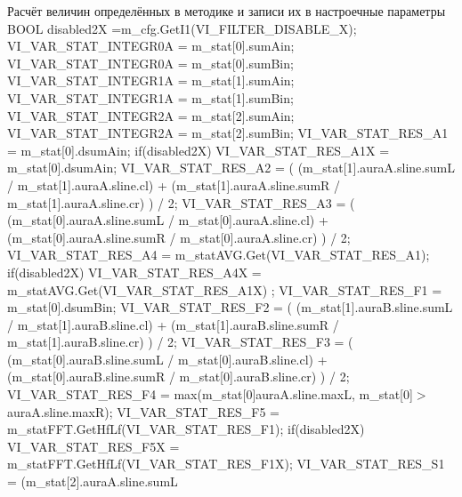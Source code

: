Расчёт величин определённых в методике и записи их в настроечные параметры B\+O\+O\+L disabled2\+X =m\+\_\+cfg.\+Get\+I1(\+V\+I\+\_\+\+F\+I\+L\+T\+E\+R\+\_\+\+D\+I\+S\+A\+B\+L\+E\+\_\+X); V\+I\+\_\+\+V\+A\+R\+\_\+\+S\+T\+A\+T\+\_\+\+I\+N\+T\+E\+G\+R0\+A = m\+\_\+stat\mbox{[}0\mbox{]}.sum\+Ain; V\+I\+\_\+\+V\+A\+R\+\_\+\+S\+T\+A\+T\+\_\+\+I\+N\+T\+E\+G\+R0\+A = m\+\_\+stat\mbox{[}0\mbox{]}.sum\+Bin; V\+I\+\_\+\+V\+A\+R\+\_\+\+S\+T\+A\+T\+\_\+\+I\+N\+T\+E\+G\+R1\+A = m\+\_\+stat\mbox{[}1\mbox{]}.sum\+Ain; V\+I\+\_\+\+V\+A\+R\+\_\+\+S\+T\+A\+T\+\_\+\+I\+N\+T\+E\+G\+R1\+A = m\+\_\+stat\mbox{[}1\mbox{]}.sum\+Bin; V\+I\+\_\+\+V\+A\+R\+\_\+\+S\+T\+A\+T\+\_\+\+I\+N\+T\+E\+G\+R2\+A = m\+\_\+stat\mbox{[}2\mbox{]}.sum\+Ain; V\+I\+\_\+\+V\+A\+R\+\_\+\+S\+T\+A\+T\+\_\+\+I\+N\+T\+E\+G\+R2\+A = m\+\_\+stat\mbox{[}2\mbox{]}.sum\+Bin; V\+I\+\_\+\+V\+A\+R\+\_\+\+S\+T\+A\+T\+\_\+\+R\+E\+S\+\_\+\+A1 = m\+\_\+stat\mbox{[}0\mbox{]}.dsum\+Ain; if(disabled2\+X) V\+I\+\_\+\+V\+A\+R\+\_\+\+S\+T\+A\+T\+\_\+\+R\+E\+S\+\_\+\+A1\+X = m\+\_\+stat\mbox{[}0\mbox{]}.dsum\+Ain; V\+I\+\_\+\+V\+A\+R\+\_\+\+S\+T\+A\+T\+\_\+\+R\+E\+S\+\_\+\+A2 = ( (m\+\_\+stat\mbox{[}1\mbox{]}.aura\+A.\+sline.\+sum\+L / m\+\_\+stat\mbox{[}1\mbox{]}.aura\+A.\+sline.\+cl) + (m\+\_\+stat\mbox{[}1\mbox{]}.aura\+A.\+sline.\+sum\+R / m\+\_\+stat\mbox{[}1\mbox{]}.aura\+A.\+sline.\+cr) ) / 2; V\+I\+\_\+\+V\+A\+R\+\_\+\+S\+T\+A\+T\+\_\+\+R\+E\+S\+\_\+\+A3 = ( (m\+\_\+stat\mbox{[}0\mbox{]}.aura\+A.\+sline.\+sum\+L / m\+\_\+stat\mbox{[}0\mbox{]}.aura\+A.\+sline.\+cl) + (m\+\_\+stat\mbox{[}0\mbox{]}.aura\+A.\+sline.\+sum\+R / m\+\_\+stat\mbox{[}0\mbox{]}.aura\+A.\+sline.\+cr) ) / 2; V\+I\+\_\+\+V\+A\+R\+\_\+\+S\+T\+A\+T\+\_\+\+R\+E\+S\+\_\+\+A4 = m\+\_\+stat\+A\+V\+G.\+Get(\+V\+I\+\_\+\+V\+A\+R\+\_\+\+S\+T\+A\+T\+\_\+\+R\+E\+S\+\_\+\+A1); if(disabled2\+X) V\+I\+\_\+\+V\+A\+R\+\_\+\+S\+T\+A\+T\+\_\+\+R\+E\+S\+\_\+\+A4\+X = m\+\_\+stat\+A\+V\+G.\+Get(\+V\+I\+\_\+\+V\+A\+R\+\_\+\+S\+T\+A\+T\+\_\+\+R\+E\+S\+\_\+\+A1\+X) ; V\+I\+\_\+\+V\+A\+R\+\_\+\+S\+T\+A\+T\+\_\+\+R\+E\+S\+\_\+\+F1 = m\+\_\+stat\mbox{[}0\mbox{]}.dsum\+Bin; V\+I\+\_\+\+V\+A\+R\+\_\+\+S\+T\+A\+T\+\_\+\+R\+E\+S\+\_\+\+F2 = ( (m\+\_\+stat\mbox{[}1\mbox{]}.aura\+B.\+sline.\+sum\+L / m\+\_\+stat\mbox{[}1\mbox{]}.aura\+B.\+sline.\+cl) + (m\+\_\+stat\mbox{[}1\mbox{]}.aura\+B.\+sline.\+sum\+R / m\+\_\+stat\mbox{[}1\mbox{]}.aura\+B.\+sline.\+cr) ) / 2; V\+I\+\_\+\+V\+A\+R\+\_\+\+S\+T\+A\+T\+\_\+\+R\+E\+S\+\_\+\+F3 = ( (m\+\_\+stat\mbox{[}0\mbox{]}.aura\+B.\+sline.\+sum\+L / m\+\_\+stat\mbox{[}0\mbox{]}.aura\+B.\+sline.\+cl) + (m\+\_\+stat\mbox{[}0\mbox{]}.aura\+B.\+sline.\+sum\+R / m\+\_\+stat\mbox{[}0\mbox{]}.aura\+B.\+sline.\+cr) ) / 2; V\+I\+\_\+\+V\+A\+R\+\_\+\+S\+T\+A\+T\+\_\+\+R\+E\+S\+\_\+\+F4 = max(m\+\_\+stat\mbox{[}0\mbox{]}aura\+A.\+sline.\+max\+L, m\+\_\+stat\mbox{[}0\mbox{]}$>$aura\+A.\+sline.\+max\+R); V\+I\+\_\+\+V\+A\+R\+\_\+\+S\+T\+A\+T\+\_\+\+R\+E\+S\+\_\+\+F5 = m\+\_\+stat\+F\+F\+T.\+Get\+Hf\+Lf(\+V\+I\+\_\+\+V\+A\+R\+\_\+\+S\+T\+A\+T\+\_\+\+R\+E\+S\+\_\+\+F1); if(disabled2\+X) V\+I\+\_\+\+V\+A\+R\+\_\+\+S\+T\+A\+T\+\_\+\+R\+E\+S\+\_\+\+F5\+X = m\+\_\+stat\+F\+F\+T.\+Get\+Hf\+Lf(\+V\+I\+\_\+\+V\+A\+R\+\_\+\+S\+T\+A\+T\+\_\+\+R\+E\+S\+\_\+\+F1\+X); V\+I\+\_\+\+V\+A\+R\+\_\+\+S\+T\+A\+T\+\_\+\+R\+E\+S\+\_\+\+S1 = (m\+\_\+stat\mbox{[}2\mbox{]}.aura\+A.\+sline.\+sum\+L 